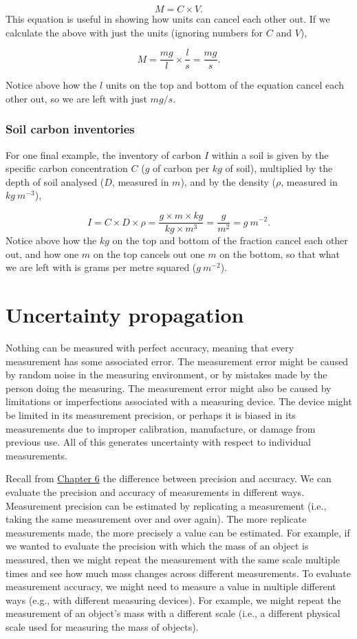 \documentclass[
  openany]{scrbook}
\begin{document}
\[M = C \times V.\]
This equation is useful in showing how units can cancel each other out.
If we calculate the above with just the units (ignoring numbers for \(C\) and \(V\)),

\[M = \frac{mg}{l} \times \frac{l}{s} = \frac{mg}{s}.\]

Notice above how the \(l\) units on the top and bottom of the equation cancel each other out, so we are left with just \(mg/s\).

\hypertarget{soil-carbon-inventories}{%
\subsection{Soil carbon inventories}\label{soil-carbon-inventories}}

For one final example, the inventory of carbon \(I\) within a soil is given by the specific carbon concentration \(C\) (\(g\) of carbon per \(kg\) of soil), multiplied by the depth of soil analysed (\(D\), measured in \(m\)), and by the density (\(\rho\), measured in \(kg\:m^{-3}\)),

\[I = C \times D \times \rho = \frac{g\times m \times kg}{kg \times m^{3}} = \frac{g}{m^{2}} = g\:m^{-2}.\]
Notice above how the \(kg\) on the top and bottom of the fraction cancel each other out, and how one \(m\) on the top cancels out one \(m\) on the bottom, so that what we are left with is grams per metre squared (\(g\:m^{-2}\)).

\hypertarget{Chapter_7}{%
\chapter{Uncertainty propagation}\label{Chapter_7}}

Nothing can be measured with perfect accuracy, meaning that every measurement has some associated error.
The measurement error might be caused by random noise in the measuring environment, or by mistakes made by the person doing the measuring.
The measurement error might also be caused by limitations or imperfections associated with a measuring device.
The device might be limited in its measurement precision, or perhaps it is biased in its measurements due to improper calibration, manufacture, or damage from previous use.
All of this generates uncertainty with respect to individual measurements.

Recall from \protect\hyperlink{Chapter_6}{Chapter 6} the difference between precision and accuracy.
We can evaluate the precision and accuracy of measurements in different ways.
Measurement precision can be estimated by replicating a measurement (i.e., taking the same measurement over and over again).
The more replicate measurements made, the more precisely a value can be estimated.
For example, if we wanted to evaluate the precision with which the mass of an object is measured, then we might repeat the measurement with the same scale multiple times and see how much mass changes across different measurements.
To evaluate measurement accuracy, we might need to measure a value in multiple different ways (e.g., with different measuring devices).
For example, we might repeat the measurement of an object's mass with a different scale (i.e., a different physical scale used for measuring the mass of objects).
\end{document}
